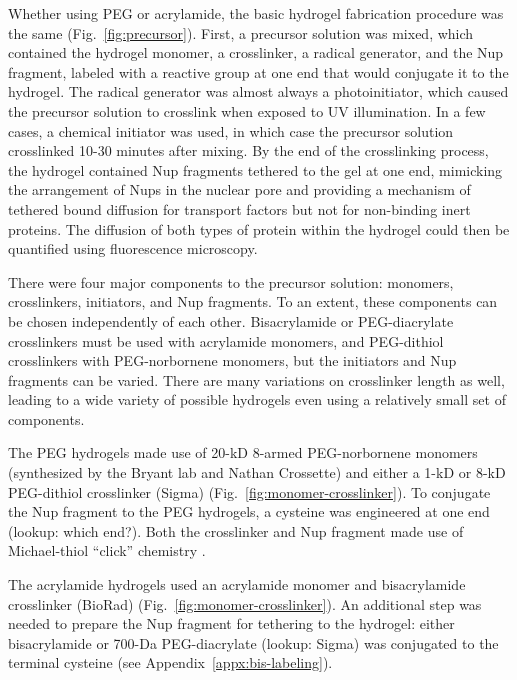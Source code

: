 Whether using PEG or acrylamide, the basic hydrogel fabrication procedure was the same (Fig.~\ref{fig:precursor}).  First, a precursor solution was mixed, which contained the hydrogel monomer, a crosslinker, a radical generator, and the Nup fragment, labeled with a reactive group at one end that would conjugate it to the hydrogel.  The radical generator was almost always a photoinitiator, which caused the precursor solution to crosslink when exposed to UV illumination.  In a few cases, a chemical initiator was used, in which case the precursor solution crosslinked 10-30 minutes after mixing.  By the end of the crosslinking process, the hydrogel contained Nup fragments tethered to the gel at one end, mimicking the arrangement of Nups in the nuclear pore and providing a mechanism of tethered bound diffusion for transport factors but not for non-binding inert proteins.  The diffusion of both types of protein within the hydrogel could then be quantified using fluorescence microscopy.

There were four major components to the precursor solution: monomers, crosslinkers, initiators, and Nup fragments.  To an extent, these components can be chosen independently of each other.  Bisacrylamide or PEG-diacrylate crosslinkers must be used with acrylamide monomers, and PEG-dithiol crosslinkers with PEG-norbornene monomers, but the initiators and Nup fragments can be varied.  There are many variations on crosslinker length as well, leading to a wide variety of possible hydrogels even using a relatively small set of components.

The PEG hydrogels made use of 20-kD 8-armed PEG-norbornene monomers (synthesized by the Bryant lab and Nathan Crossette) and either a 1-kD or 8-kD PEG-dithiol crosslinker (Sigma) (Fig.~\ref{fig:monomer-crosslinker}).  To conjugate the Nup fragment to the PEG hydrogels, a cysteine was engineered at one end (lookup: which end?).  Both the crosslinker and Nup fragment made use of Michael-thiol ``click'' chemistry \cite{chatani14}\cite{nair14}.

The acrylamide hydrogels used an acrylamide monomer and bisacrylamide crosslinker (BioRad) (Fig.~\ref{fig:monomer-crosslinker}).  An additional step was needed to prepare the Nup fragment for tethering to the hydrogel: either bisacrylamide or 700-Da PEG-diacrylate (lookup: Sigma) was conjugated to the terminal cysteine (see Appendix~\ref{appx:bis-labeling}).

